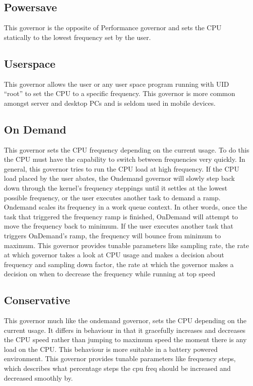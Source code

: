\subsection{Powersave}
This governor is the opposite of Performance governor and sets the CPU statically to the lowest frequency set by the user.

\subsection{Userspace}
This governor allows the user or any user space program running with UID “root” to set the CPU to a specific frequency. This governor is more common amongst server and desktop PCs and is seldom used in mobile devices.

\subsection{On Demand}
This governor sets the CPU frequency depending on the current usage. To do this the CPU must have the capability to switch between frequencies very quickly. In general, this governor tries to run the CPU load at high frequency. If the CPU load placed by the user abates, the Ondemand governor will slowly step back down through the kernel's frequency steppings until it settles at the lowest possible frequency, or the user executes another task to demand a ramp.
Ondemand scales its frequency in a work queue context. In other words, once the task that triggered the frequency ramp is finished, OnDemand will attempt to move the frequency back to minimum. If the user executes another task that triggers OnDemand's ramp, the frequency will bounce from minimum to maximum.
This governor provides tunable parameters like sampling rate, the rate at which governor takes a look at CPU usage and makes a decision about frequency and sampling down factor, the rate at which the governor makes a decision on when to decrease the frequency while running at top speed

\subsection{Conservative}
This governor much like the ondemand governor, sets the CPU depending on the current usage.  It differs in behaviour in that it gracefully increases and decreases the CPU speed rather than jumping to maximum speed the moment there is any load on the CPU. This behaviour is more suitable in a battery powered environment.
This governor provides tunable parameters like frequency steps, which describes what percentage steps the cpu freq should be increased and decreased smoothly by.

